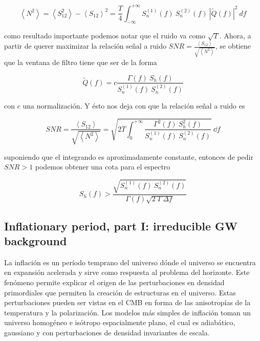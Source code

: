 \begin{equation}
    \left\langle N^2 \right\rangle = \left\langle S_{12}^2 \right\rangle - \left\langle S_{12} \right\rangle^2 = \frac{T}{4} \int_{-\infty}^{+\infty} S_n^{(1)} (f) \ S_n^{(2)} (f) \ \left| \tilde{Q} (f) \right|^2 \ df
\end{equation}

\noindent
como resultado importante podemos notar que el ruido va como $\sqrt{T}$. Ahora, a partir de querer maximizar la relación señal a ruido $\displaystyle SNR = \frac{\left\langle S_{12} \right\rangle}{\sqrt{\left\langle N^2 \right\rangle}}$, se obtiene que la ventana de filtro tiene que ser de la forma

\begin{equation}
    \tilde{Q} (f) = c \frac{\Gamma (f) \ S_h (f)}{S^{(1)}_n (f) \ S_n^{(2)} (f)}
\end{equation}

\noindent
con $c$ una normalización. Y ésto nos deja con que la relación señal a ruido es

\begin{equation}
    SNR = \frac{\left\langle S_{12} \right\rangle}{\sqrt{\left\langle N^2 \right\rangle}} = \sqrt{2 T \int_{0}^{+\infty} \frac{\Gamma^2 (f) \ S_h^2 (f)}{S^{(1)}_n (f) \ S_n^{(2)} (f)}} \ \dd f
\end{equation}

\noindent
suponiendo que el integrando es aproximadamente constante, entonces de pedir $SNR > 1$ podemos obtener una cota para el espectro

\begin{equation}
    S_h (f) > \frac{\sqrt{S_n^{(1)} (f) \ S_n^{(2)} (f)}}{\Gamma (f) \sqrt{2 \ T \ \Delta f}}
\end{equation}

\subsection{Inflationary period, part I: irreducible GW background}

La inflación es un período temprano del universo dónde el universo se encuentra en expansión acelerada y sirve como respuesta al problema del horizonte. Este fenómeno permite explicar el origen de las perturbaciones en densidad primordiales que permiten la creación de estructuras en el universo. Estas perturbaciones pueden ser vistas en el CMB en forma de las anisotropías de la temperatura y la polarización. Los modelos más simples de inflación toman un universo homogéneo e isótropo espacialmente plano, el cual es adiabático, gaussiano y con perturbaciones de densidad invariantes de escala.


